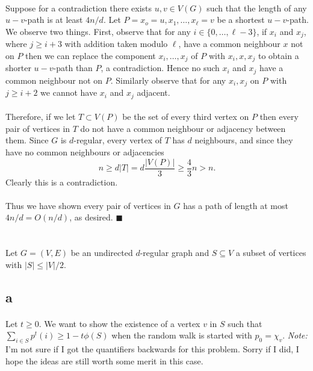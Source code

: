 \documentclass[letterpaper,12pt,oneside,onecolumn]{article}
\begin{document}
	\paragraph{}
	Suppose for a contradiction there exists $u,v \in V(G)$ such that the length of any $u-v$-path is at least $4n/d$. Let $P=x_o=u, x_1, \dots, x_\ell=v$ be a shortest $u-v$-path. We observe two things. First, observe that for any $i \in \{0,\dots, \ell-3\}$, if $x_i$ and $x_{j}$, where $j \geq i+3$ with addition taken modulo $\ell$, have a common neighbour $x$ not on $P$ then we can replace the component $x_i,\dots, x_j$ of $P$ with $x_i, x, x_{j}$ to obtain a shorter $u-v$-path than $P$, a contradiction. Hence no such $x_i$ and $x_{j}$ have a common neighbour not on $P$. Similarly observe that for any $x_i, x_j$ on $P$ with $j \geq i+2$ we cannot have $x_i$ and $x_j$ adjacent. 
	\paragraph{}
	Therefore, if we let $T\subset V(P)$ be the set of every third vertex on $P$ then every pair of vertices in $T$ do not have a common neighbour or adjacency between them. Since $G$ is $d$-regular, every vertex of $T$ has $d$ neighbours, and since they have no common neighbours or adjacencies
	$$n \geq d|T| =d\frac{|V(P)|}{3} \geq \frac{4}{3}n > n.$$
	Clearly this is a contradiction.
	\paragraph{}
	Thus we have shown every pair of vertices in $G$ has a path of length at most $4n/d = O(n/d)$, as desired. $\blacksquare$
	\newpage
	\section{}
	\paragraph{}
	Let $G=(V,E)$ be an undirected $d$-regular graph and $S\subseteq V$ a subset of vertices with $|S| \leq |V|/2$.
	\subsection{a}
	\paragraph{}
	Let $t \geq 0$. We want to show the existence of a vertex $v$ in $S$ such that $\sum_{i\in S} p^t(i) \geq 1- t\phi(S)$ when the random walk is started with $p_0 =\chi_v$. \emph{Note:} I'm not sure if I got the quantifiers backwards for this problem. Sorry if I did, I hope the ideas are still worth some merit in this case.
\end{document}
